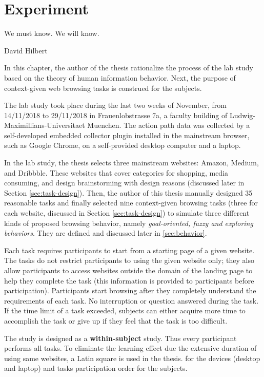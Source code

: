 \section{Experiment}
\label{ch:exp}

\epigraph{We must know. We will know.}{David Hilbert}

In this chapter, the author of the thesis rationalize the process of the lab study 
based on the theory of human information behavior. 
Next, the purpose of context-given web browsing tasks is construed for the subjects.

The lab study took place during the last two weeks of November, from 14/11/2018 to 29/11/2018
in Frauenlobstrasse 7a, a faculty building of Ludwig-Maximillians-Universitaet Muenchen.
The action path data was collected by a self-developed embedded collector plugin installed in 
the mainstream browser, such as Google Chrome, on a self-provided desktop computer and a laptop.

In the lab study, the thesis selects three mainstream websites: Amazon, Medium, and Dribbble. 
These websites that cover categories for shopping, media consuming, and design brainstorming 
with design reasons (discussed later in Section \ref{sec:task-design}).
Then, the author of this thesis manually designed 35 reasonable tasks and finally selected nine 
context-given browsing tasks (three for each website, discussed in 
Section \ref{sec:task-design}) to simulate three different kinds of proposed browsing behavior,
namely \emph{goal-oriented, fuzzy and exploring behaviors}. They are defined and discussed 
later in \ref{sec:behavior}.

Each task requires participants to start from a starting page of a given website. 
The tasks do not restrict participants to using the given website only; they also allow
participants to access websites outside the domain of the landing page to help 
they complete the task 
(this information is provided to participants before participation).
Participants start browsing after they completely understand the requirements of 
each task. No interruption or question answered during the task.
If the time limit of a task exceeded, subjects can either acquire more time 
to accomplish the task or give up if they feel that the task is too difficult.

The study is designed as a \textbf{within-subject} study. Thus every participant performs all tasks. 
To eliminate the learning effect due the extensive duration of using same websites, 
a Latin square \cite{cochran1950experimental} is used in the thesis.
for the devices (desktop and laptop) and tasks participation order for the subjects.

